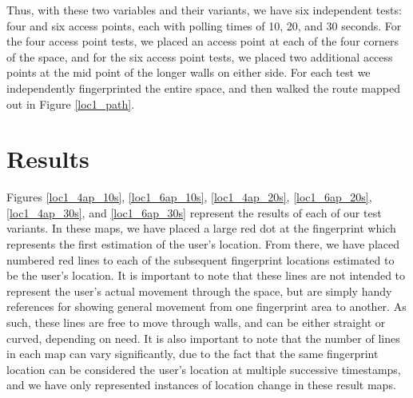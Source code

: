 Thus, with these two variables and their variants, we have six independent tests: four and six access points, each with polling times of 10, 20, and 30 seconds. For the four access point tests, we placed an access point at each of the four corners of the space, and for the six access point tests, we placed two additional access points at the mid point of the longer walls on either side. For each test we independently fingerprinted the entire space, and then walked the route mapped out in Figure \ref{loc1_path}.


\section{Results}
%


Figures \ref{loc1_4ap_10s}, \ref{loc1_6ap_10s}, \ref{loc1_4ap_20s}, \ref{loc1_6ap_20s}, \ref{loc1_4ap_30s}, and \ref{loc1_6ap_30s} represent the results of each of our test variants. In these maps, we have placed a large red dot at the fingerprint which represents the first estimation of the user's location. From there, we have placed numbered red lines to each of the subsequent fingerprint locations estimated to be the user's location. It is important to note that these lines are not intended to represent the user's actual movement through the space, but are simply handy references for showing general movement from one fingerprint area to another. As such, these lines are free to move through walls, and can be either straight or curved, depending on need.  It is also important to note that the number of lines in each map can vary significantly, due to the fact that the same fingerprint location can be considered the user's location at multiple successive timestamps, and we have only represented instances of location change in these result maps. 


